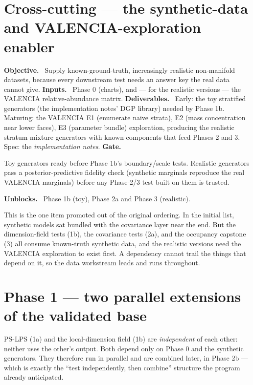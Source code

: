 \documentclass[11pt]{article}
\newcommand{\field}[1]{\smallskip\noindent\textbf{\textsf{#1.}}\ }
\begin{document}
\section{Cross-cutting --- the synthetic-data and VALENCIA-exploration enabler}\label{sec:data}

\field{Objective} Supply known-ground-truth, increasingly realistic non-manifold
datasets, because every downstream test needs an answer key the real data cannot
give.
\field{Inputs} Phase 0 (charts), and --- for the realistic versions --- the VALENCIA
relative-abundance matrix.
\field{Deliverables} Early: the toy stratified generators (the implementation
notes' DGP library) needed by Phase 1b. Maturing: the VALENCIA E1 (enumerate naive
strata), E2 (mass concentration near lower faces), E3 (parameter bundle) exploration,
producing the realistic stratum-mixture generators with known components that feed
Phases 2 and 3. Spec: the \emph{implementation notes}.
\field{Gate} \begin{gate} Toy generators ready before Phase 1b's boundary/scale
tests. Realistic generators pass a posterior-predictive fidelity check (synthetic
marginals reproduce the real VALENCIA marginals) before any Phase-2/3 test built on
them is trusted.\end{gate}
\field{Unblocks} Phase 1b (toy), Phase 2a and Phase 3 (realistic).

\begin{note}
This is the one item promoted out of the original ordering. In the initial list,
synthetic models sat bundled with the covariance layer near the end. But the
dimension-field tests (1b), the covariance tests (2a), and the occupancy capstone
(3) all consume known-truth synthetic data, and the realistic versions need the
VALENCIA exploration to exist first. A dependency cannot trail the things that
depend on it, so the data workstream leads and runs throughout.
\end{note}

\section{Phase 1 --- two parallel extensions of the validated base}\label{sec:phase1}

PS-LPS (1a) and the local-dimension field (1b) are \emph{independent} of each
other: neither uses the other's output. Both depend only on Phase 0 and the
synthetic generators. They therefore run in parallel and are combined later, in
Phase 2b --- which is exactly the ``test independently, then combine'' structure the
program already anticipated.
\end{document}
